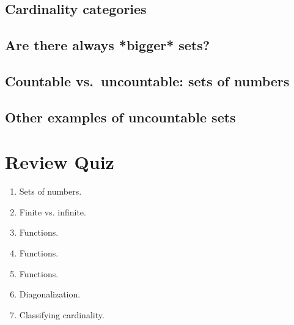 \subsection*{Cardinality categories}



\subsection*{Are there always *bigger* sets?}

\newpage
\subsection*{Countable vs.\ uncountable: sets of numbers}

\subsection*{Other examples of uncountable sets}

\newpage

\section*{Review Quiz}
\begin{enumerate}
    \item Sets of numbers. \hspace{1in}\\ 
    \item Finite vs. infinite. \hspace{1in}\\ 
    \item Functions. \hspace{1in}\\ 
    \item Functions. \hspace{1in}\\  
    \item Functions. \hspace{1in}\\  
    \item Diagonalization. \hspace{1in}\\ 
    \item Classifying cardinality. \hspace{1in}\\ 
\end{enumerate}
